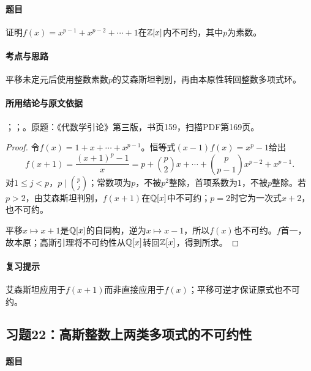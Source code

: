 \label{ex:4:21}

\paragraph{题目}

证明$f(x)=x^{p-1}+x^{p-2}+\cdots+1$在$\mathbb Z[x]$内不可约，其中$p$为素数。

\paragraph{考点与思路}

平移未定元后使用整数素数$p$的艾森斯坦判别，再由本原性转回整数多项式环。

\paragraph{所用结论与原文依据}

；；。原题：《代数学引论》第三版，书页159，扫描PDF第169页。


\begin{proof}

令$f(x)=1+x+\cdots+x^{p-1}$。恒等式$(x-1)f(x)=x^p-1$给出
\[
f(x+1)=\frac{(x+1)^p-1}{x}
=p+\binom p2x+\cdots+\binom p{p-1}x^{p-2}+x^{p-1}.
\]
对$1\le j<p$，$p\mid\binom pj$；常数项为$p$，不被$p^2$整除，首项系数为$1$，不被$p$整除。若$p>2$，由艾森斯坦判别，$f(x+1)$在$\mathbb Q[x]$中不可约；$p=2$时它为一次式$x+2$，也不可约。

平移$x\mapsto x+1$是$\mathbb Q[x]$的自同构，逆为$x\mapsto x-1$，所以$f(x)$也不可约。$f$首一，故本原；高斯引理将不可约性从$\mathbb Q[x]$转回$\mathbb Z[x]$，得到所求。

\end{proof}

\paragraph{复习提示}

艾森斯坦应用于$f(x+1)$而非直接应用于$f(x)$；平移可逆才保证原式也不可约。

\subsection{习题22：高斯整数上两类多项式的不可约性}

\label{ex:4:22}

\paragraph{题目}

